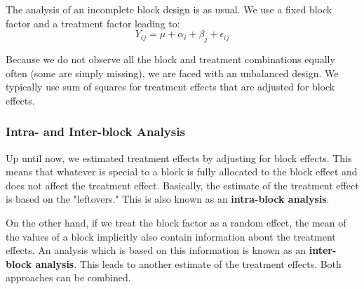 The analysis of an incomplete block design is as usual. We use a fixed block factor and a treatment factor leading to:
$$Y_{ij} = \mu + \alpha_i + \beta_j + \epsilon_{ij}$$

Because we do not observe all the block and treatment combinations equally often (some are simply missing), we are faced with an unbalanced design. We typically use sum of squares for treatment effects that are adjusted for block effects.

\subsubsection{Intra- and Inter-block Analysis}

Up until now, we estimated treatment effects by adjusting for block effects. This means that whatever is special to a block is fully allocated to the block effect and does not affect the treatment effect. Basically, the estimate of the treatment effect is based on the "leftovers." This is also known as an \textbf{intra-block analysis}. \medskip

On the other hand, if we treat the block factor as a random effect, the mean of the values of a block implicitly also contain information about the treatment effects. An analysis which is based on this information is known as an \textbf{inter-block analysis}. This leads to another estimate of the treatment effects. Both approaches can be combined.
